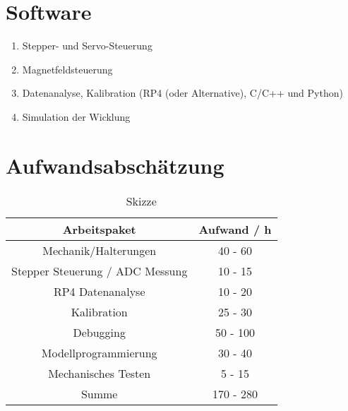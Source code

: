 \section*{Software}
\begin{enumerate}
    \item Stepper- und Servo-Steuerung
    \item Magnetfeldsteuerung
    \item Datenanalyse, Kalibration (RP4 (oder Alternative), C/C++ und Python)
    \item Simulation der Wicklung
\end{enumerate}

\section*{Aufwandsabschätzung}
\begin{table}[H]
    \centering
    \caption{
        Skizze
    }
    \begin{tabular}{| c | c |}
        \hline
        Arbeitspaket &  Aufwand / h\\
        \hline
        Mechanik/Halterungen & 40 - 60  \\
        \hline
        Stepper Steuerung / ADC Messung & 10 - 15 \\
        \hline
        RP4 Datenanalyse & 10 - 20  \\
        \hline
        Kalibration & 25 - 30 \\
        \hline
        Debugging & 50 - 100 \\
        \hline
        Modellprogrammierung & 30 - 40 \\
        \hline
        Mechanisches Testen & 5 - 15 \\
        \hline
        \hline
        Summe & 170 - 280  \\
        \hline
    \end{tabular}
    \label{tab:Aufwand}
\end{table}